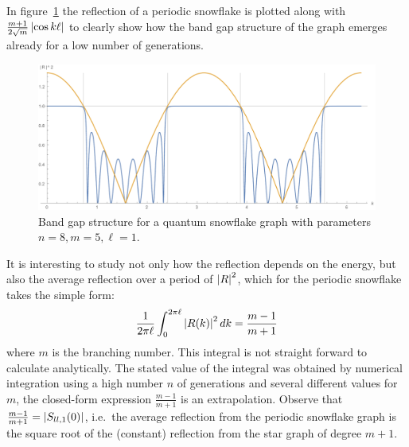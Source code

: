 In figure~\ref{fig: periodic snowflake reflection band gap} the reflection of a periodic snowflake is plotted along with $\frac{m+1}{2\sqrt{m}} \left\lvert\cos k\ell\right\rvert$ to clearly show how the band gap structure of the graph emerges already for a low number of generations.


\begin{figure}[!h]
  \centering
  \includegraphics[width=\textwidth]{img/reflection_n=4_m=5_l=1_b=1_int=2pi_bandgap}
  \caption{Band gap structure for a quantum snowflake graph with parameters $n=8, m=5, \ell=1$.}
  \label{fig: periodic snowflake reflection band gap}
\end{figure}


It is interesting to study not only how the reflection depends on the energy, but also the average reflection over a period of $\left\lvert R\right\rvert^2$, which for the periodic snowflake takes the simple form:
\[
  \frac{1}{2\pi\ell} \int_{0}^{2\pi\ell} \left\lvert R(k)\right\rvert^2 dk = \frac{m-1}{m+1}
\]
where $m$ is the branching number.
This integral is not straight forward to calculate analytically. The stated value of the integral was obtained by numerical integration using a high number $n$ of generations and several different values for $m$, the closed-form expression $\frac{m-1}{m+1}$ is an extrapolation. Observe that $\frac{m-1}{m+1} = \left\lvert S_{ll,1}(0)\right\rvert$, i.e.\ the average reflection from the periodic snowflake graph is the square root of the (constant) reflection from the star graph of degree $m+1$.




